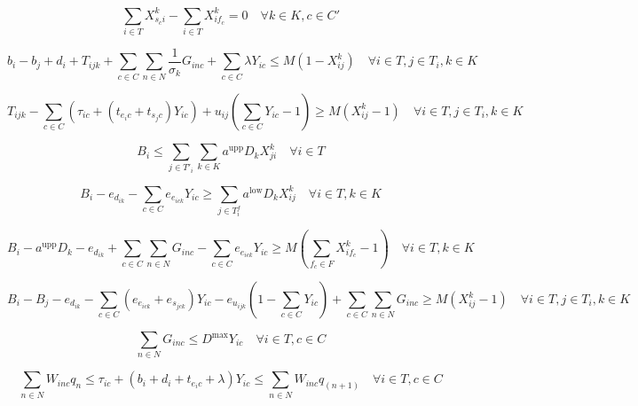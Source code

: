 \documentclass[10pt]{article}
\begin{document}
\begin{equation}
\sum_{i \in T} X^k_{s_c i} - \sum_{i \in T} X^k_{i f_c} = 0 \quad \forall k \in K, c \in C' \tag{5}
\end{equation}

\begin{equation}
b_i - b_j + d_i + T_{ijk} + \sum_{c \in C} \sum_{n \in N} \frac{1}{\sigma_k} G_{inc} + \sum_{c \in C} \lambda Y_{ic} \le M(1 - X^k_{ij}) \quad \forall i \in T, j \in T_i, k \in K \tag{6}
\end{equation}

\begin{equation}
T_{ijk} - \sum_{c \in C} \left( \tau_{ic} + (t_{e_i c} + t_{s_j c}) Y_{ic} \right) + u_{ij} \left( \sum_{c \in C} Y_{ic} - 1 \right) \ge M(X^k_{ij} - 1) \quad \forall i \in T, j \in T_i, k \in K \tag{7}
\end{equation}

\begin{equation}
B_i \le \sum_{j \in T'_i} \sum_{k \in K} a^{\text{upp}} D_k X^k_{ji} \quad \forall i \in T \tag{8}
\end{equation}

\begin{equation}
B_i - e_{d_{ik}} - \sum_{c \in C} e_{e_{ic k}} Y_{ic} \ge \sum_{j \in T^f_i} a^{\text{low}} D_k X^k_{ij} \quad \forall i \in T, k \in K \tag{9}
\end{equation}

\begin{equation}
B_i - a^{\text{upp}} D_k - e_{d_{ik}} + \sum_{c \in C} \sum_{n \in N} G_{inc} - \sum_{c \in C} e_{e_{ic k}} Y_{ic} \ge M \left( \sum_{f_c \in F} X^k_{i f_c} - 1 \right) \quad \forall i \in T, k \in K \tag{10}
\end{equation}

\begin{equation}
B_i - B_j - e_{d_{ik}} - \sum_{c \in C} (e_{e_{ic k}} + e_{s_{j c k}}) Y_{ic} - e_{u_{ij k}} \left( 1 - \sum_{c \in C} Y_{ic} \right) + \sum_{c \in C} \sum_{n \in N} G_{inc} \ge M(X^k_{ij} - 1) \quad \forall i \in T, j \in T_i, k \in K \tag{11}
\end{equation}

\begin{equation}
\sum_{n \in N} G_{inc} \le D^{\max} Y_{ic} \quad \forall i \in T, c \in C \tag{12}
\end{equation}

\begin{equation}
\sum_{n \in N} W_{inc} q_n \le \tau_{ic} + (b_i + d_i + t_{e_i c} + \lambda) Y_{ic} \le \sum_{n \in N} W_{inc} q_{(n+1)} \quad \forall i \in T, c \in C \tag{13}
\end{equation}
\end{document}
